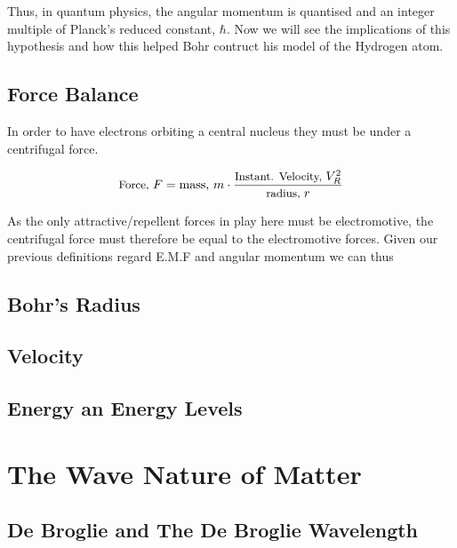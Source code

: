 \documentclass[colorlinks,11pt,a4paper,normalphoto,withhyper,ragged2e]{altareport}
\begin{document}
		\vspace{5mm}
		
		Thus, in quantum physics, the angular momentum is quantised and an integer multiple of Planck's reduced constant, $\hbar$. Now we will see the implications of this hypothesis and how this helped Bohr contruct his model of the Hydrogen atom. \linebreak
		
		
	\subsection{Force Balance}
		In order to have electrons orbiting a central nucleus they must be under a centrifugal force. \linebreak
		
		\begin{equation*}
			\text{\small Force, }F = \text{mass, }m \cdot \frac{\text{\small Instant. Velocity, }V_R^2}{\text{\small radius, }r}
		\end{equation*}
		
		As the only attractive/repellent forces in play here must be electromotive, the centrifugal force must therefore be equal to the electromotive forces. Given our previous definitions regard E.M.F and angular momentum we can thus \linebreak
		
		
	\subsection{Bohr’s Radius}
		
		
	\subsection{Velocity}
	
	
	\subsection{Energy an Energy Levels}
	
	
	\pagebreak
	
	
	
	
\section{The Wave Nature of Matter}
	
	\subsection{De Broglie and The De Broglie Wavelength}
	
\end{document}
